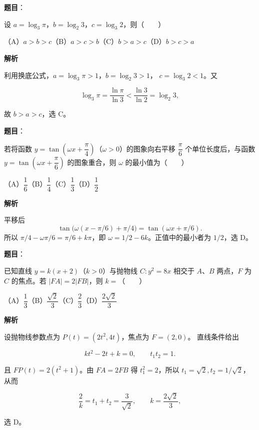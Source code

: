 \begin{answer}

\textbf{题目}：

设 $a=\log_3\pi$，$b=\log_2 3$，$c=\log_3 2$，则\mbox{（　　）}

（A）$a>b>c$\quad（B）$a>c>b$\quad（C）$b>a>c$\quad（D）$b>c>a$

\textbf{解析}

利用换底公式，$a=\log_3\pi>1$，$b=\log_2 3>1$，
$c=\log_3 2<1$。又

\nopagebreak[4]
\[
\log_3\pi=\frac{\ln\pi}{\ln3}<\frac{\ln3}{\ln2}
=\log_2 3,
\]

故 $b>a>c$，选 C。


\end{answer}
\begin{answer}

\textbf{题目}：

若将函数 $y=\tan\left(\omega x+\dfrac\pi4\right)$（$\omega>0$）的图象向右平移 $\dfrac\pi6$ 个单位长度后，与函数 $y=\tan\left(\omega x+\dfrac\pi6\right)$ 的图象重合，则 $\omega$ 的最小值为\mbox{（　　）}

（A）$\dfrac16$\quad（B）$\dfrac14$\quad（C）$\dfrac13$\quad（D）$\dfrac12$

\textbf{解析}

平移后
\nopagebreak[4]
\[
\tan\bigl(\omega(x-\pi/6)+\pi/4\bigr)
=\tan(\omega x+\pi/6).
\]
所以 $\pi/4-\omega\pi/6=\pi/6+k\pi$，即
$\omega=1/2-6k$。正值中的最小者为 $1/2$，选 D。


\end{answer}
\begin{answer}

\textbf{题目}：

已知直线 $y=k(x+2)$（$k>0$）与抛物线 $C:y^2=8x$ 相交于 $A\text{、}B$ 两点，$F$ 为 $C$ 的焦点。若 $|FA|=2|FB|$，则 $k=$\mbox{（　　）}

（A）$\dfrac13$\quad（B）$\dfrac{\sqrt2}{3}$\quad（C）$\dfrac23$\quad（D）$\dfrac{2\sqrt2}{3}$

\textbf{解析}

设抛物线参数点为 $P(t)=(2t^2,4t)$，焦点为 $F=(2,0)$。
直线条件给出

\nopagebreak[4]
\[
kt^2-2t+k=0,\qquad t_1t_2=1.
\]

且 $FP(t)=2(t^2+1)$。由 $FA=2FB$ 得
$t_1^2=2$，所以 $t_1=\sqrt2,t_2=1/\sqrt2$，从而

\nopagebreak[4]
\[
\frac2k=t_1+t_2=\frac3{\sqrt2},
\qquad k=\frac{2\sqrt2}{3},
\]

选 D。


\end{answer}

